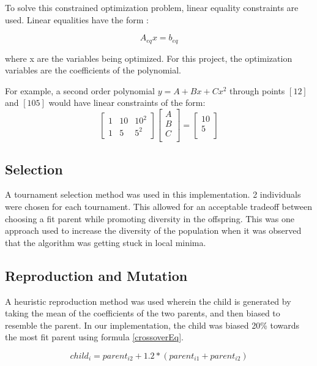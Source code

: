To solve this constrained optimization problem, linear equality constraints are used. Linear equalities
have the form :

\begin{equation}
A_{eq}x = b_{eq}
\end{equation}

where x are the variables being optimized. For this project, the optimization variables are the
coefficients of the polynomial.

For example, a second order polynomial $y = A + Bx + Cx^2$ through points $[1 2]$ and $[10 5]$ would have linear constraints of the form:
\begin{equation} 
\begin{bmatrix}
1 & 10 & 10^2 \\
1 & 5 & 5^2
\end{bmatrix}
\begin{bmatrix}
A \\
B \\
C \\
\end{bmatrix} = 
\begin{bmatrix}
10 \\
5 \\
\end{bmatrix}
\end{equation}
\subsection{Selection}
A tournament selection method was used in this implementation. 2 individuals were chosen for each tournament. This allowed for an acceptable tradeoff between choosing a fit parent while promoting diversity in the offspring. This was one approach used to increase the diversity of the population when it was observed that the algorithm was getting stuck in local minima.

\subsection{Reproduction and Mutation}
A heuristic reproduction method was used wherein the child is generated by taking the mean of the coefficients of the two parents, and then biased to resemble the parent. In our implementation, the child was biased 20\% towards the most fit parent using formula \ref{crossoverEq}.

\begin{equation} \label{crossoverEq}
child_i = parent_{i2} + 1.2 * (parent_{i1} + parent_{i2})
\end{equation}

